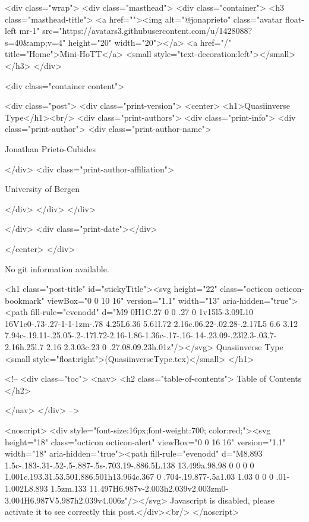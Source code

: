     <div class="wrap">
      <div class="masthead">
        <div class="container">
          <h3 class="masthead-title">
            <a href=""><img alt="@jonaprieto" class="avatar float-left mr-1" src="https://avatars3.githubusercontent.com/u/1428088?s=40&amp;v=4" height="20" width="20"></a>
            <a href="/" title="Home">Mini-HoTT</a>
            <small style="text-decoration:left"></small>
          </h3>
        </div>
      
      <div class="container content">
        







<div class="post">
  <div class="print-version">
    <center>
      <h1>Quasiinverse Type</h1><br/>
        <div class="print-authors">
          <div class="print-info">
            <div class="print-author">
              <div class="print-author-name">
                
                  Jonathan Prieto-Cubides
                
              </div>
              <div class="print-author-affiliation">
                
                  University of Bergen
                
                </div>
            </div>
          </div>
          
          
        </div>
        <div class="print-date"></div>
        
        
    </center>
  </div>

  
  No git information available.
  

  <h1 class="post-title" id="stickyTitle"><svg height="22" class="octicon octicon-bookmark" viewBox="0 0 10 16" version="1.1" width="13" aria-hidden="true"><path fill-rule="evenodd" d="M9 0H1C.27 0 0 .27 0 1v15l5-3.09L10 16V1c0-.73-.27-1-1-1zm-.78 4.25L6.36 5.61l.72 2.16c.06.22-.02.28-.2.17L5 6.6 3.12 7.94c-.19.11-.25.05-.2-.17l.72-2.16-1.86-1.36c-.17-.16-.14-.23.09-.23l2.3-.03.7-2.16h.25l.7 2.16 2.3.03c.23 0 .27.08.09.23h.01z"/></svg> Quasiinverse Type <small style="float:right">(QuasiinverseType.tex)</small>
  </h1>

  <!-- 
  <div class="toc">
    <nav>
    <h2 class="table-of-contents"> Table of Contents </h2>
      

    </nav>
  </div>
   -->

  <noscript>
  <div style="font-size:16px;font-weight:700; color:red;"><svg height="18" class="octicon octicon-alert" viewBox="0 0 16 16" version="1.1" width="18" aria-hidden="true"><path fill-rule="evenodd" d="M8.893 1.5c-.183-.31-.52-.5-.887-.5s-.703.19-.886.5L.138 13.499a.98.98 0 0 0 0 1.001c.193.31.53.501.886.501h13.964c.367 0 .704-.19.877-.5a1.03 1.03 0 0 0 .01-1.002L8.893 1.5zm.133 11.497H6.987v-2.003h2.039v2.003zm0-3.004H6.987V5.987h2.039v4.006z"/></svg> Javascript is disabled, please activate it to see correctly this post.</div><br/>
  </noscript>


